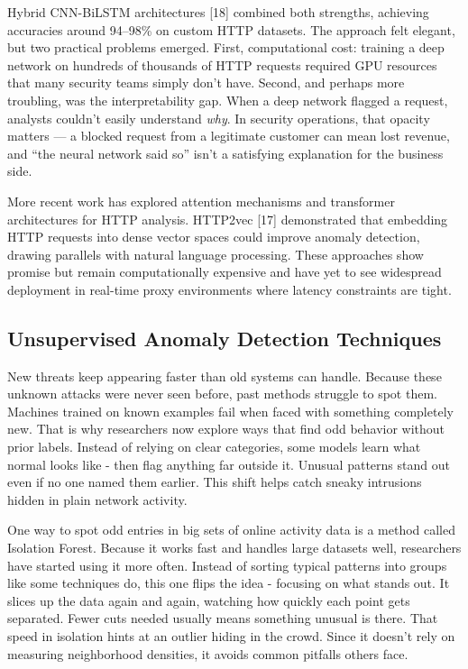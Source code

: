 \documentclass[journal,onecolumn]{IEEEtran}
\begin{document}
Hybrid CNN-BiLSTM architectures [18] combined both strengths, achieving accuracies around 94--98\% on custom HTTP datasets. The approach felt elegant, but two practical problems emerged. First, computational cost: training a deep network on hundreds of thousands of HTTP requests required GPU resources that many security teams simply don't have. Second, and perhaps more troubling, was the interpretability gap. When a deep network flagged a request, analysts couldn't easily understand \textit{why}. In security operations, that opacity matters --- a blocked request from a legitimate customer can mean lost revenue, and ``the neural network said so'' isn't a satisfying explanation for the business side.

More recent work has explored attention mechanisms and transformer architectures for HTTP analysis. HTTP2vec [17] demonstrated that embedding HTTP requests into dense vector spaces could improve anomaly detection, drawing parallels with natural language processing. These approaches show promise but remain computationally expensive and have yet to see widespread deployment in real-time proxy environments where latency constraints are tight.

\subsection{Unsupervised Anomaly Detection Techniques}
New threats keep appearing faster than old systems can handle. Because these unknown attacks were never seen before, past methods struggle to spot them. Machines trained on known examples fail when faced with something completely new. That is why researchers now explore ways that find odd behavior without prior labels. Instead of relying on clear categories, some models learn what normal looks like - then flag anything far outside it. Unusual patterns stand out even if no one named them earlier. This shift helps catch sneaky intrusions hidden in plain network activity.

One way to spot odd entries in big sets of online activity data is a method called Isolation Forest. Because it works fast and handles large datasets well, researchers have started using it more often. Instead of sorting typical patterns into groups like some techniques do, this one flips the idea - focusing on what stands out. It slices up the data again and again, watching how quickly each point gets separated. Fewer cuts needed usually means something unusual is there. That speed in isolation hints at an outlier hiding in the crowd. Since it doesn't rely on measuring neighborhood densities, it avoids common pitfalls others face.
\end{document}
